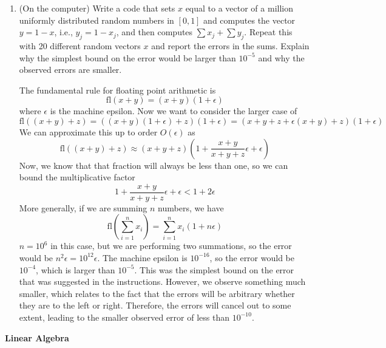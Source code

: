 \documentclass[12pt]{article}
\begin{document}
\begin{enumerate}
\begin{enumerate}
    \end{enumerate}

    \item (On the computer) Write a code that sets \(x\) equal to a vector of a million uniformly distributed random numbers in \([0, 1]\) and computes the vector \(y = 1 - x\), i.e., \(y_j = 1 - x_j\), and then computes \( \sum x_j + \sum y_j \). Repeat this with 20 different random vectors \(x\) and report the errors in the sums. Explain why the simplest bound on the error would be larger than \(10^{-5}\) and why the observed errors are smaller.

The fundamental rule for floating point arithmetic is
\begin{equation}
    \text{fl}(x + y) = (x + y)(1 + \epsilon)
\end{equation}
where \(\epsilon\) is the machine epsilon. Now we want to consider the larger case of
\begin{equation}
    \text{fl}{((x+y)+z)} = ((x + y)(1 + \epsilon) + z)(1 + \epsilon) = (x + y + z + \epsilon(x + y) + z)(1 + \epsilon)
\end{equation}
We can approximate this up to order \(O(\epsilon)\) as
\begin{equation}
    \text{fl}{((x+y)+z)} \approx (x + y + z)(1 + \frac{x+y}{x+y+z}\epsilon + \epsilon)
\end{equation}
Now, we know that that fraction will always be less than one, so we can bound the multiplicative factor
\begin{equation}
    1 + \frac{x+y}{x+y+z}\epsilon + \epsilon < 1 + 2\epsilon
\end{equation}
More generally, if we are summing \(n\) numbers, we have
\begin{equation}
    \text{fl}(\sum_{i=1}^{n} x_i) = \sum_{i=1}^{n} x_i(1 + n\epsilon)
\end{equation}
\(n=10^6\) in this case, but we are performing two summations, so the error would be \(n^2\epsilon = 10^{12}\epsilon\). The machine epsilon is \(10^{-16}\), so the error would be \(10^{-4}\), which is larger than \(10^{-5}\). This was the simplest bound on the error that was suggested in the instructions. However, we observe something much smaller, which relates to the fact that the errors will be arbitrary whether they are to the left or right. Therefore, the errors will cancel out to some extent, leading to the smaller observed error of less than $10^{-10}$.
\end{enumerate}

\textbf{Linear Algebra}
\end{document}
